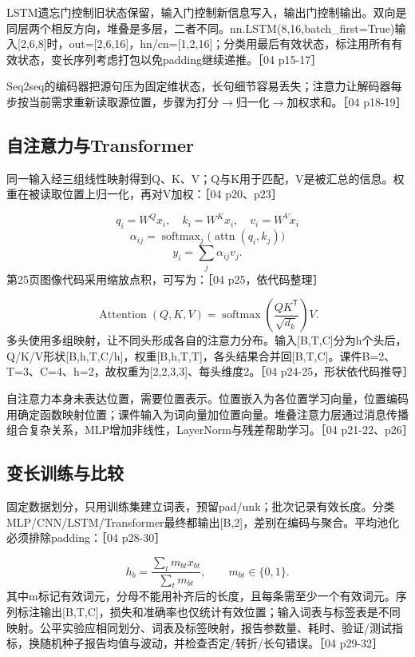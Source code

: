 \documentclass[UTF8,a4paper,zihao=-4,fontset=windows]{ctexart}
\begin{document}
LSTM遗忘门控制旧状态保留，输入门控制新信息写入，输出门控制输出。双向是同层两个相反方向，堆叠是多层，二者不同。nn.LSTM(8,16,batch\_first=True)输入[2,6,8]时，out=[2,6,16]，hn/\allowbreak{}cn=[1,2,16]；分类用最后有效状态，标注用所有有效状态，变长序列考虑打包以免padding继续递推。［04 p15-17］

Seq2seq的编码器把源句压为固定维状态，长句细节容易丢失；注意力让解码器每步按当前需求重新读取源位置，步骤为打分\ensuremath{\rightarrow}归一化\ensuremath{\rightarrow}加权求和。［04 p18-19］

\subsection{自注意力与Transformer}
同一输入经三组线性映射得到Q、K、V；Q与K用于匹配，V是被汇总的信息。权重在被读取位置上归一化，再对V加权：［04 p20、p23］

\[q_i=W^Qx_i,\quad k_i=W^Kx_i,\quad v_i=W^Vx_i\]
\[\alpha_{ij}=\operatorname{softmax}_j\!\bigl(\operatorname{attn}(q_i,k_j)\bigr)\]
\[y_i=\sum_j\alpha_{ij}v_j.\]
第25页图像代码采用缩放点积，可写为：［04 p25，依代码整理］

\[\operatorname{Attention}(Q,K,V)=\operatorname{softmax}\!\left(\frac{QK^{\mathsf T}}{\sqrt{d_k}}\right)V.\]
多头使用多组映射，让不同头形成各自的注意力分布。输入[B,T,C]分为h个头后，Q/\allowbreak{}K/\allowbreak{}V形状[B,h,T,C/\allowbreak{}h]，权重[B,h,T,T]，各头结果合并回[B,T,C]。课件B=2、T=3、C=4、h=2，故权重为[2,2,3,3]、每头维度2。［04 p24-25，形状依代码推导］

自注意力本身未表达位置，需要位置表示。位置嵌入为各位置学习向量，位置编码用确定函数映射位置；课件输入为词向量加位置向量。堆叠注意力层通过消息传播组合复杂关系，MLP增加非线性，LayerNorm与残差帮助学习。［04 p21-22、p26］

\subsection{变长训练与比较}
固定数据划分，只用训练集建立词表，预留pad/\allowbreak{}unk；批次记录有效长度。分类MLP/\allowbreak{}CNN/\allowbreak{}LSTM/\allowbreak{}Transformer最终都输出[B,2]，差别在编码与聚合。平均池化必须排除padding：［04 p28-30］

\[h_b=\frac{\sum_t m_{bt}x_{bt}}{\sum_t m_{bt}},\qquad m_{bt}\in\{0,1\}.\]
其中m标记有效词元，分母不能用补齐后的长度，且每条需至少一个有效词元。序列标注输出[B,T,C]，损失和准确率也仅统计有效位置；输入词表与标签表是不同映射。公平实验应相同划分、词表及标签映射，报告参数量、耗时、验证/\allowbreak{}测试指标，换随机种子报告均值与波动，并检查否定/\allowbreak{}转折/\allowbreak{}长句错误。［04 p29-32］
\end{document}
